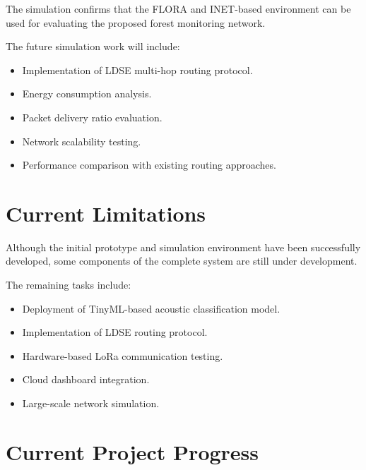 The simulation confirms that the FLORA and INET-based environment can be used for
evaluating the proposed forest monitoring network.

The future simulation work will include:

\begin{itemize}
    \item Implementation of LDSE multi-hop routing protocol.
    \item Energy consumption analysis.
    \item Packet delivery ratio evaluation.
    \item Network scalability testing.
    \item Performance comparison with existing routing approaches.
\end{itemize}


\section{Current Limitations}

Although the initial prototype and simulation environment have been successfully
developed, some components of the complete system are still under development.

The remaining tasks include:

\begin{itemize}
    \item Deployment of TinyML-based acoustic classification model.
    \item Implementation of LDSE routing protocol.
    \item Hardware-based LoRa communication testing.
    \item Cloud dashboard integration.
    \item Large-scale network simulation.
\end{itemize}


\section{Current Project Progress}

